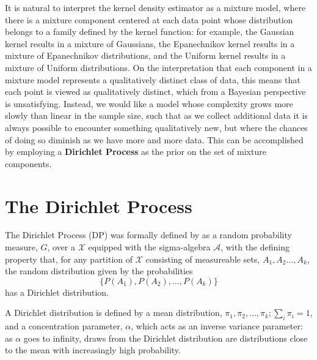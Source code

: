 It is natural to interpret the kernel density estimator as a mixture
model, where there is a mixture component centered at each data point
whose distribution belongs to a family defined by the kernel function:
for example, the Gaussian kernel results in a mixture of Gaussians,
the Epanechnikov kernel \citep{epanechnikov1969non} 
results in a mixture of Epanechnikov distributions, and the Uniform
kernel results in a mixture of Uniform distributions.  On the
interpretation that each component in a mixture model represents a
qualitatively distinct class of data, this means that each point is
viewed as qualitatively distinct, which from a Bayesian perspective
is unsatisfying.  Instead, we would like a model whose complexity
grows more slowly than linear in the sample size, such that as we
collect additional data it is always possible to encounter something
qualitatively new, but where the chances of doing so diminish as we
have more and more data.  This can be accomplished by employing a {\bf
Dirichlet Process} as the prior on the set of mixture components.

\section{The Dirichlet Process}
\label{sec:dirichlet-process}

The Dirichlet Process (DP) was formally defined by
\citet{ferguson1973bayesian} as a random probability measure, $G$, over a
$\mathcal{X}$ equipped with the sigma-algebra $\mathcal{A}$, with the
defining property that, for any partition of $\mathcal{X}$ consisting
of measureable sets, $A_1, A_2 \dots, A_k$, the random distribution given
by the probabilities
\begin{equation*}
  \{P(A_1), P(A_2), \dots, P(A_k)\}
\end{equation*}
has a Dirichlet distribution.

A Dirichlet distribution is defined by a mean distribution, $\pi_1,
\pi_2, \dots, \pi_k; \sum_i \pi_i = 1$, and a concentration parameter,
$\alpha$, which acts as an inverse variance parameter: as $\alpha$
goes to infinity, draws from the Dirichlet distribution are
distributions close to the mean with increasingly high probability.

